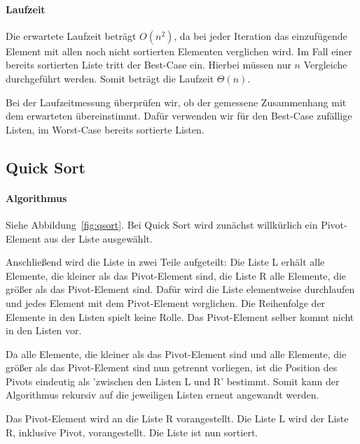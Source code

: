 \documentclass[11pt]{article}
\begin{document}
    \paragraph{Laufzeit}\label{subsubsec:ilaufzeit}
    Die erwartete Laufzeit beträgt \(O(n^2)\), da bei jeder Iteration das
    einzufügende Element mit allen noch nicht sortierten Elementen verglichen
    wird.
    Im Fall einer bereits sortierten Liste tritt der Best-Case ein.
    Hierbei müssen nur \(n\) Vergleiche durchgeführt werden.
    Somit beträgt die Laufzeit \(\Theta(n)\).

    Bei der Laufzeitmessung überprüfen wir, ob der gemessene Zusammenhang mit
    dem erwarteten übereinstimmt.
    Dafür verwenden wir für den Best-Case zufällige Listen, im Worst-Case
    bereits sortierte Listen.


    \subsection{Quick Sort}\label{subsec:quick-sort}

    \paragraph{Algorithmus}\label{subsec:Qalgorithmus}
    Siehe Abbildung~\ref{fig:qsort}.
    Bei Quick Sort wird zunächst willkürlich ein Pivot-Element aus der Liste
    ausgewählt.

    Anschließend wird die Liste in zwei Teile aufgeteilt: Die Liste L erhält
    alle Elemente, die kleiner als das Pivot-Element sind, die Liste R alle
    Elemente, die größer als das Pivot-Element sind.
    Dafür wird die Liste elementweise durchlaufen und jedes Element mit dem
    Pivot-Element verglichen.
    Die Reihenfolge der Elemente in den Listen spielt keine Rolle.
    Das Pivot-Element selber kommt nicht in den Listen vor.

    Da alle Elemente, die kleiner als das Pivot-Element sind und alle Elemente,
    die größer als das Pivot-Element sind nun getrennt vorliegen, ist die
    Position des Pivots eindeutig als 'zwischen den Listen L und R' bestimmt.
    Somit kann der Algorithmus rekursiv auf die jeweiligen Listen erneut
    angewandt werden.

    Das Pivot-Element wird an die Liste R vorangestellt.
    Die Liste L wird der Liste R, inklusive Pivot, vorangestellt.
    Die Liste ist nun sortiert.\\
\end{document}
